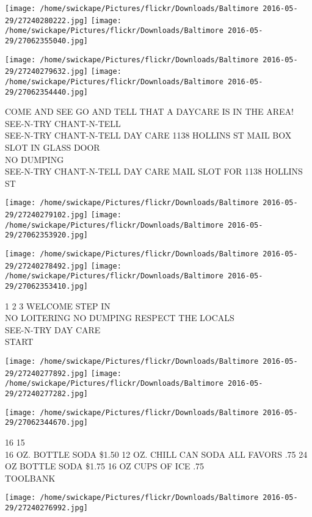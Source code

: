\documentclass[10pt,letterpaper]{article}
\begin{document}
\texttt{[image: /home/swickape/Pictures/flickr/Downloads/Baltimore 2016-05-29/27240280222.jpg]}
\texttt{[image: /home/swickape/Pictures/flickr/Downloads/Baltimore 2016-05-29/27062355040.jpg]}

\texttt{[image: /home/swickape/Pictures/flickr/Downloads/Baltimore 2016-05-29/27240279632.jpg]}
\texttt{[image: /home/swickape/Pictures/flickr/Downloads/Baltimore 2016-05-29/27062354440.jpg]}

COME AND SEE GO AND TELL THAT A DAYCARE IS IN THE AREA!  SEE{-}N{-}TRY CHANT{-}N{-}TELL\\
SEE{-}N{-}TRY CHANT{-}N{-}TELL DAY CARE 1138 HOLLINS ST MAIL BOX SLOT IN GLASS DOOR\\
NO DUMPING\\
SEE{-}N{-}TRY CHANT{-}N{-}TELL DAY CARE MAIL SLOT FOR 1138 HOLLINS ST\\
\pagebreak

\texttt{[image: /home/swickape/Pictures/flickr/Downloads/Baltimore 2016-05-29/27240279102.jpg]}
\texttt{[image: /home/swickape/Pictures/flickr/Downloads/Baltimore 2016-05-29/27062353920.jpg]}

\texttt{[image: /home/swickape/Pictures/flickr/Downloads/Baltimore 2016-05-29/27240278492.jpg]}
\texttt{[image: /home/swickape/Pictures/flickr/Downloads/Baltimore 2016-05-29/27062353410.jpg]}

1 2 3 WELCOME STEP IN\\
NO LOITERING NO DUMPING RESPECT THE LOCALS\\
SEE{-}N{-}TRY DAY CARE\\
START\\
\pagebreak

\texttt{[image: /home/swickape/Pictures/flickr/Downloads/Baltimore 2016-05-29/27240277892.jpg]}
\texttt{[image: /home/swickape/Pictures/flickr/Downloads/Baltimore 2016-05-29/27240277282.jpg]}

\texttt{[image: /home/swickape/Pictures/flickr/Downloads/Baltimore 2016-05-29/27062344670.jpg]}

16 15\\
16 OZ. BOTTLE SODA \$1.50 12 OZ. CHILL CAN SODA ALL FAVORS .75 24 OZ BOTTLE SODA \$1.75 16 OZ CUPS OF ICE .75\\
TOOLBANK\\
\pagebreak

\texttt{[image: /home/swickape/Pictures/flickr/Downloads/Baltimore 2016-05-29/27240276992.jpg]}
\end{document}
